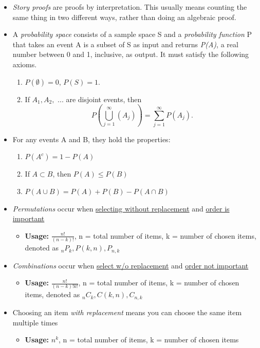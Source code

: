 \documentclass[12pt, letterpaper]{article}
\begin{document}
\begin{itemize}
    \item \textit{Story proofs} are proofs by interpretation. This usually means counting the same thing in two different ways, rather than doing an algebraic proof.
    \item A \textit{probability space} consists of a sample space S and a \textit{probability function} P that takes an event A is a subset of S as input and returns \textit{P(A)}, a real number between 0 and 1, inclusive, as output. It must satisfy the following axioms.
    \begin{enumerate}
        \item \(P(\emptyset) = 0\), \(P(S) = 1\).
        \item If \(A_{1}, A_{2},\) ... are disjoint events, then \[P(\bigcup\limits_{j=1}^{\infty}(A_{j})) = \sum\limits_{j=1}^{\infty}P(A_{j}).\]
    \end{enumerate}
    \item For any events A and B, they hold the properties:
    \begin{enumerate}
        \item \(P(A^{c}) = 1 - P(A) \)
        \item If \(A \subset B \), then \(P(A) \leq P(B) \)
        \item \(P(A \cup B) = P(A) + P(B) - P(A \cap B) \)
    \end{enumerate}
    \item \textit{Permutations} occur when \underline{selecting without replacement} and \underline{order is important}
    \begin{itemize}
        \item \textbf{Usage: }\(\frac{n!}{(n - k)!} \), n = total number of items, k = number of chosen items, denoted as \(_{n}P_{k}, P(k, n), P_{n, k}\)
    \end{itemize}
    \item \textit{Combinations} occur when \underline{select w/o replacement} and \underline{order not important}
    \begin{itemize}
        \item \textbf{Usage: }\(\frac{n!}{(n - k)!k!} \), n = total number of items, k = number of chosen items, denoted as \(_{n}C_{k}, C(k, n), C_{n, k}  \)
    \end{itemize}
    \item Choosing an item \textit{with replacement} means you can choose the same item multiple times
    \begin{itemize}
        \item \textbf{Usage: }\(n^{k}\), n = total number of items, k = number of chosen items
    \end{itemize}
\end{itemize}
\end{document}
